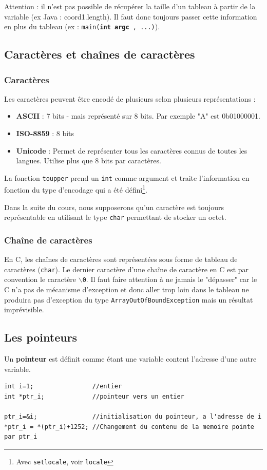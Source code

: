 Attention : il n'est pas possible de récupérer la taille d'un tableau à partir de la variable (ex Java : coord1.length).
Il faut donc toujours passer cette information en plus du tableau (ex : \texttt{main(\textbf{int argc} , ...)}).

\subsection{Caractères et chaînes de caractères}
\subsubsection{Caractères}
Les caractères peuvent être encodé de plusieurs selon plusieurs représentations :
\begin{itemize}
  \item \textbf{ASCII} : 7 bits - mais représenté sur 8 bits.
    Par exemple "A" est 0b01000001.
  \item \textbf{ISO-8859} : 8 bits
  \item \textbf{Unicode} : Permet de représenter tous les caractères connus de toutes les langues.
    Utilise plus que 8 bits par caractères.
\end{itemize}
La fonction \texttt{toupper} prend un \texttt{int} comme argument et traite l'information en fonction du type d'encodage qui a été défini\footnote{Avec \texttt{setlocale}, voir \texttt{locale}}.

Dans la suite du cours, nous supposerons qu'un caractère est toujours représentable en utilisant le type \texttt{char} permettant de stocker un octet.

\subsubsection{Chaîne de caractères}
En C, les chaînes de caractères sont représentées sous forme de tableau de caractères (\texttt{char}).
Le dernier caractère d'une chaîne de caractère en C est par convention le caractère \texttt{$\backslash$0}.
Il faut faire attention à ne jamais le "dépasser" car le C n'a pas de mécanisme d'exception et donc aller trop loin dans le tableau ne produira pas d'exception du type \texttt{ArrayOutOfBoundException} mais un résultat imprévisible.


\subsection{Les pointeurs}
Un \textbf{pointeur} est définit comme étant une variable content l'adresse d'une autre variable.
\begin{lstlisting}
int i=1;				//entier
int *ptr_i;				//pointeur vers un entier

ptr_i=&i;				//initialisation du pointeur, a l'adresse de i
*ptr_i = *(ptr_i)+1252;	//Changement du contenu de la memoire pointe par ptr_i
\end{lstlisting}

